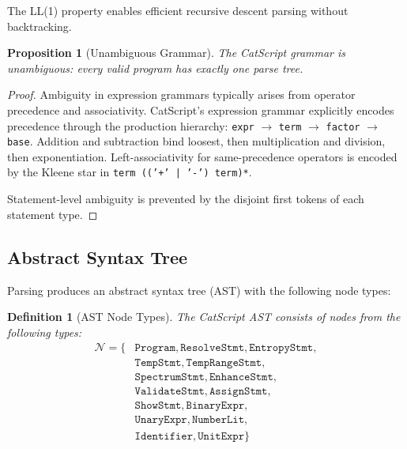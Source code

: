 \documentclass[twocolumn,10pt]{article}
\newtheorem{proposition}[theorem]{Proposition}
\newtheorem{definition}[theorem]{Definition}
\begin{document}
The LL(1) property enables efficient recursive descent parsing without backtracking.

\begin{proposition}[Unambiguous Grammar]
The CatScript grammar is unambiguous: every valid program has exactly one parse tree.
\end{proposition}

\begin{proof}
Ambiguity in expression grammars typically arises from operator precedence and associativity. CatScript's expression grammar explicitly encodes precedence through the production hierarchy: \texttt{expr} $\to$ \texttt{term} $\to$ \texttt{factor} $\to$ \texttt{base}. Addition and subtraction bind loosest, then multiplication and division, then exponentiation. Left-associativity for same-precedence operators is encoded by the Kleene star in \texttt{term (('+' | '-') term)*}.

Statement-level ambiguity is prevented by the disjoint first tokens of each statement type.
\end{proof}

\subsection{Abstract Syntax Tree}

Parsing produces an abstract syntax tree (AST) with the following node types:

\begin{definition}[AST Node Types]
The CatScript AST consists of nodes from the following types:
\begin{align*}
    \mathcal{N} = \{&\texttt{Program}, \texttt{ResolveStmt}, \texttt{EntropyStmt}, \\
                    &\texttt{TempStmt}, \texttt{TempRangeStmt}, \\
                    &\texttt{SpectrumStmt}, \texttt{EnhanceStmt}, \\
                    &\texttt{ValidateStmt}, \texttt{AssignStmt}, \\
                    &\texttt{ShowStmt}, \texttt{BinaryExpr}, \\
                    &\texttt{UnaryExpr}, \texttt{NumberLit}, \\
                    &\texttt{Identifier}, \texttt{UnitExpr}\}
\end{align*}
\end{definition}
\end{document}
